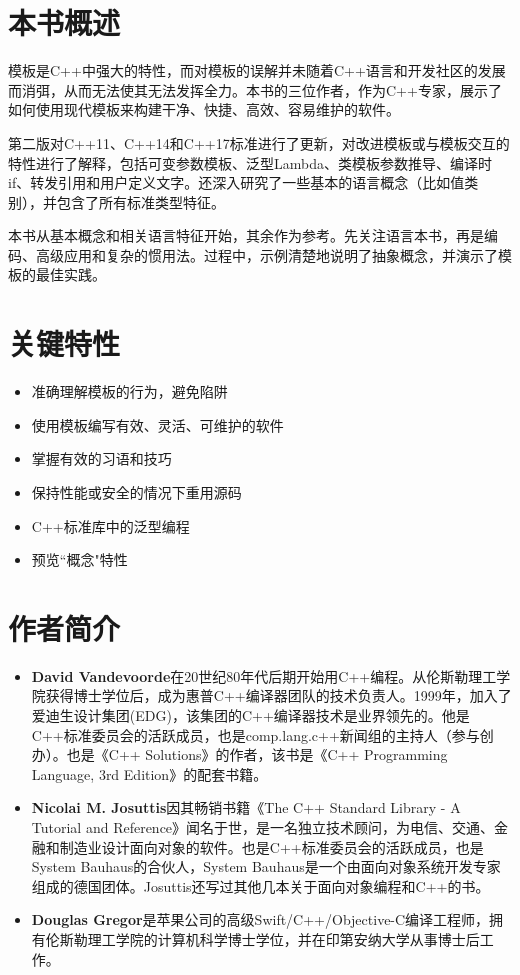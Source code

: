 \maketitle

\section{本书概述}

模板是C++中强大的特性，而对模板的误解并未随着C++语言和开发社区的发展而消弭，从而无法使其无法发挥全力。本书的三位作者，作为C++专家，展示了如何使用现代模板来构建干净、快捷、高效、容易维护的软件。

第二版对C++11、C++14和C++17标准进行了更新，对改进模板或与模板交互的特性进行了解释，包括可变参数模板、泛型Lambda、类模板参数推导、编译时if、转发引用和用户定义文字。还深入研究了一些基本的语言概念（比如值类别），并包含了所有标准类型特征。

本书从基本概念和相关语言特征开始，其余作为参考。先关注语言本书，再是编码、高级应用和复杂的惯用法。过程中，示例清楚地说明了抽象概念，并演示了模板的最佳实践。

\section{关键特性}
\begin{itemize}
  \item 准确理解模板的行为，避免陷阱
  \item 使用模板编写有效、灵活、可维护的软件
  \item 掌握有效的习语和技巧
  \item 保持性能或安全的情况下重用源码
  \item C++标准库中的泛型编程
  \item 预览“概念"特性
\end{itemize}

\section{作者简介}

\begin{itemize}
  \item \textbf{David Vandevoorde}在20世纪80年代后期开始用C++编程。从伦斯勒理工学院获得博士学位后，成为惠普C++编译器团队的技术负责人。1999年，加入了爱迪生设计集团(EDG)，该集团的C++编译器技术是业界领先的。他是C++标准委员会的活跃成员，也是comp.lang.c++新闻组的主持人（参与创办）。也是《C++ Solutions》的作者，该书是《C++ Programming Language, 3rd Edition》的配套书籍。

  \item \textbf{Nicolai M. Josuttis}因其畅销书籍《The C++ Standard Library - A Tutorial and Reference》闻名于世，是一名独立技术顾问，为电信、交通、金融和制造业设计面向对象的软件。也是C++标准委员会的活跃成员，也是System Bauhaus的合伙人，System Bauhaus是一个由面向对象系统开发专家组成的德国团体。Josuttis还写过其他几本关于面向对象编程和C++的书。

  \item \textbf{Douglas Gregor}是苹果公司的高级Swift/C++/Objective-C编译工程师，拥有伦斯勒理工学院的计算机科学博士学位，并在印第安纳大学从事博士后工作。
\end{itemize}


